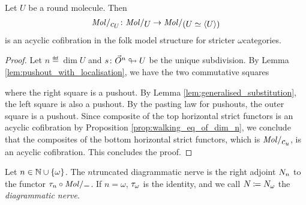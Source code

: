 \begin{prop} \label{prop:molecin_send_Jcomp_to_acof}
    Let \( U \) be a round molecule.
    Then
    \begin{equation*}
        \molecin{c_U} \colon \molecin{U} \to \molecin{(U \simeq \compos{U})}
    \end{equation*}
    is an acyclic cofibration in the folk model structure for stricter \( \omega \)\nbd categories.
\end{prop}
\begin{proof}
    Let \( n \eqdef \dim U \) and \( s \colon \vec{O}^{n} \looparrowright U \) be the unique subdivision.
    By Lemma \ref{lem:pushout_with_localisation}, we have the two commutative squares
    \begin{center}
    \end{center}
    where the right square is a pushout.
    By Lemma \ref{lem:generalised_substitution}, the left square is also a pushout.
    By the pasting law for pushouts, the outer square is a pushout.
    Since composite of the top horizontal strict functors is an acyclic cofibration by Proposition \ref{prop:walking_eq_of_dim_n}, we conclude that the composites of the bottom horizontal strict functors, which is \( \molecin{c_u} \), is an acyclic cofibration.
    This concludes the proof.
\end{proof}


\begin{dfn} 
    Let \( n \in \mathbb{N} \cup \left\{ {\omega} \right\} \). 
    The \( n \)\nbd truncated diagrammatic nerve is the right adjoint \( N_{n} \) to the functor \( \trunc{n} \after \molecin{-} \).
    If \( n = \omega \), \( \tau_{\omega} \) is the identity, and we call \( N_{} \coloneqq N_{\omega} \) the \emph{diagrammatic nerve}.
\end{dfn}

